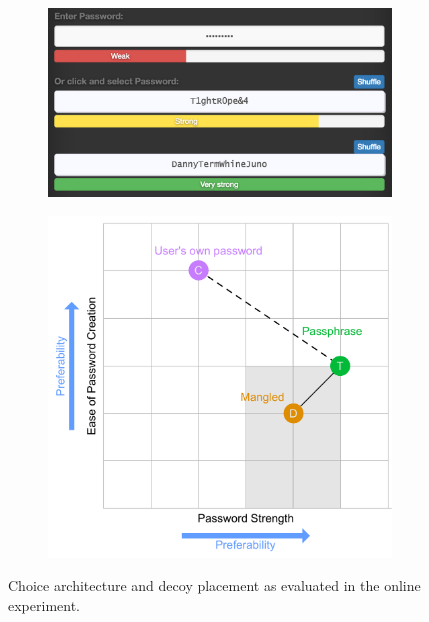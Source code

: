 \begin{figure}[t]
	\centering
	\begin{subfigure}[!t]{0.49\textwidth}
		\includegraphics[width=\textwidth]{figures/decoy/generator_prolific_3}
		\caption{\label{fig:decoy:screenshot-prolific}}
	\end{subfigure}
	\begin{subfigure}[!t]{0.49\textwidth}
		\includegraphics[width=\textwidth]{figures/decoy/decoy-dimensions-prolific}
		\caption{\label{fig:decoy:dimensions-prolific}}
	\end{subfigure}
	\caption{\label{fig:decoy:design-architecture-prolific}Choice architecture and decoy placement as evaluated in the online experiment. } 
\end{figure}

